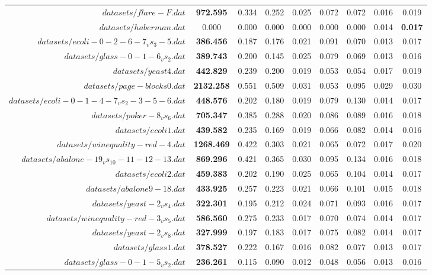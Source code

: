 \begin{table}[!ht]
{\begin{tabular}{r c c c c c c c c}
$datasets/flare-F.dat$ & \textbf{972.595} & 0.334 & 0.252 & 0.025 & 0.072 & 0.072 & 0.016 & 0.019 \\
$datasets/haberman.dat$ & 0.000 & 0.000 & 0.000 & 0.000 & 0.000 & 0.000 & 0.014 & \textbf{0.017} \\
$datasets/ecoli-0-2-6-7_vs_3-5.dat$ & \textbf{386.456} & 0.187 & 0.176 & 0.021 & 0.091 & 0.070 & 0.013 & 0.017 \\
$datasets/glass-0-1-6_vs_2.dat$ & \textbf{389.743} & 0.200 & 0.145 & 0.025 & 0.079 & 0.069 & 0.013 & 0.016 \\
$datasets/yeast4.dat$ & \textbf{442.829} & 0.239 & 0.200 & 0.019 & 0.053 & 0.054 & 0.017 & 0.019 \\
$datasets/page-blocks0.dat$ & \textbf{2132.258} & 0.551 & 0.509 & 0.031 & 0.053 & 0.095 & 0.029 & 0.030 \\
$datasets/ecoli-0-1-4-7_vs_2-3-5-6.dat$ & \textbf{448.576} & 0.202 & 0.180 & 0.019 & 0.079 & 0.130 & 0.014 & 0.017 \\
$datasets/poker-8_vs_6.dat$ & \textbf{705.347} & 0.385 & 0.288 & 0.020 & 0.086 & 0.089 & 0.016 & 0.018 \\
$datasets/ecoli1.dat$ & \textbf{439.582} & 0.235 & 0.169 & 0.019 & 0.066 & 0.082 & 0.014 & 0.016 \\
$datasets/winequality-red-4.dat$ & \textbf{1268.469} & 0.422 & 0.303 & 0.021 & 0.065 & 0.072 & 0.017 & 0.020 \\
$datasets/abalone-19_vs_10-11-12-13.dat$ & \textbf{869.296} & 0.421 & 0.365 & 0.030 & 0.095 & 0.134 & 0.016 & 0.018 \\
$datasets/ecoli2.dat$ & \textbf{459.383} & 0.202 & 0.190 & 0.025 & 0.065 & 0.104 & 0.014 & 0.017 \\
$datasets/abalone9-18.dat$ & \textbf{433.925} & 0.257 & 0.223 & 0.021 & 0.066 & 0.101 & 0.015 & 0.018 \\
$datasets/yeast-2_vs_4.dat$ & \textbf{322.301} & 0.195 & 0.212 & 0.024 & 0.071 & 0.093 & 0.016 & 0.017 \\
$datasets/winequality-red-3_vs_5.dat$ & \textbf{586.560} & 0.275 & 0.233 & 0.017 & 0.070 & 0.074 & 0.014 & 0.017 \\
$datasets/yeast-2_vs_8.dat$ & \textbf{327.999} & 0.197 & 0.183 & 0.017 & 0.075 & 0.082 & 0.014 & 0.017 \\
$datasets/glass1.dat$ & \textbf{378.527} & 0.222 & 0.167 & 0.016 & 0.082 & 0.077 & 0.013 & 0.017 \\
$datasets/glass-0-1-5_vs_2.dat$ & \textbf{236.261} & 0.115 & 0.090 & 0.012 & 0.048 & 0.056 & 0.013 & 0.016 \\

\end{tabular}}
\end{table}
